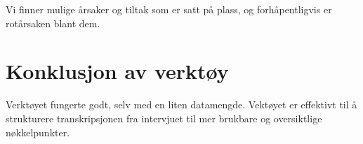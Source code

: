 Vi finner mulige årsaker og tiltak som er satt på plass, og forhåpentligvis er rotårsaken blant dem.

\section{Konklusjon av verktøy}
Verktøyet fungerte godt, selv med en liten datamengde. Vektøyet er effektivt til å strukturere transkripsjonen fra intervjuet til mer brukbare og oversiktlige nøkkelpunkter. 
